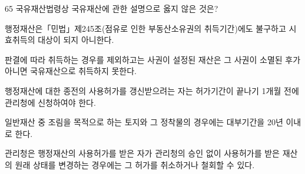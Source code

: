 \begin{question}{65}
국유재산법령상 국유재산에 관한 설명으로 옳지 않은 것은?
\begin{choices}
  \item 행정재산은「민법」제245조(점유로 인한 부동산소유권의 취득기간)에도 불구하고 시효취득의 대상이 되지 아니한다.
  \item 판결에 따라 취득하는 경우를 제외하고는 사권이 설정된 재산은 그 사권이 소멸된 후가 아니면 국유재산으로 취득하지 못한다.
  \item 행정재산에 대한 종전의 사용허가를 갱신받으려는 자는 허가기간이 끝나기 1개월 전에 관리청에 신청하여야 한다.
  \item 일반재산 중 조림을 목적으로 하는 토지와 그 정착물의 경우에는 대부기간을 20년 이내로 한다.
  \item 관리청은 행정재산의 사용허가를 받은 자가 관리청의 승인 없이 사용허가를 받은 재산의 원래 상태를 변경하는 경우에는 그 허가를 취소하거나 철회할 수 있다.
\end{choices}
\end{question}
